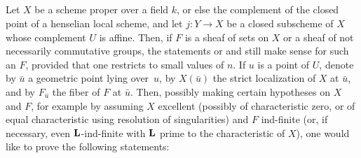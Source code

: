 \subsection{\texorpdfstring{}{XIV.6.2}} \label{XIV.6.2}
Let $X$ be a scheme proper over a field $k$, or else the complement of the closed point of a henselian local scheme, and let $j:Y \to X$ be a closed subscheme of $X$ whose complement $U$ is affine. Then, if $F$ is a sheaf of sets on $X$ or a sheaf of not necessarily commutative groups, the statements  or  and  still make sense for such an $F$, provided that one restricts to small values of $n$. If $u$ is a point of $U$, denote by $\bar{u}$ a geometric point lying over~$u$, by $X(\bar{u})$ the strict localization of $X$ at $\bar{u}$, and by $F_{\bar{u}}$ the fiber of $F$ at $\bar{u}$. Then, possibly making certain hypotheses on $X$ and $F$, for example by assuming $X$ excellent (possibly of characteristic zero, or of equal characteristic using resolution of singularities) and $F$ ind-finite (or, if necessary, even $\mathbf L$-ind-finite with $\mathbf L$ prime to the characteristic of $X$), one would like to prove the following statements:
